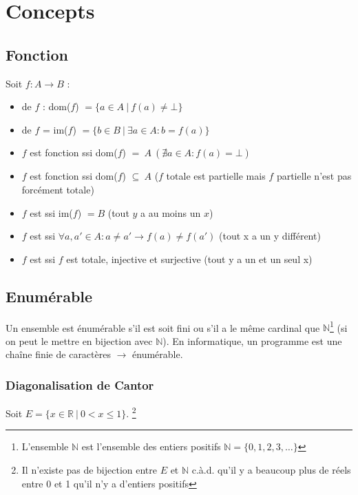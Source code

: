 \chapter{Concepts}

\section{Fonction}

Soit $f : A \rightarrow B$ :
\begin{itemize}
\item {} de $f$ : dom($f$) $= \{a \in A \ | \ f(a) \neq \bot\}$
\item {} de $f$ = im($f$) $= \{b \in B \ | \ \exists a \in A : b = f(a)\}$
\item $f$ est fonction  ssi dom($f$) $= \ A \ (\nexists a \in A : f(a) = \bot)$ 
\item $f$ est fonction  ssi dom($f$) $\subseteq \ A$ ($f$ totale est partielle mais $f$ partielle n'est pas forcément totale)
\item $f$ est  ssi im($f$) $= B$ (tout $y$ a au moins un $x$)
\item $f$ est  ssi $\forall a, a' \in A : a \neq a' \rightarrow f(a) \neq f(a')$ (tout x a un y différent)
\item $f$ est  ssi $f$ est totale, injective et surjective (tout y a un et un seul x)
\end{itemize}
\section{Enumérable}

Un ensemble est énumérable s'il est soit fini ou s'il a le même cardinal que $\mathbb{N}$\footnote{L'ensemble $\mathbb{N}$ est l'ensemble des entiers positifs $\mathbb{N} = \{0, 1, 2, 3, \ldots\}$} (si on peut le mettre en bijection avec $\mathbb{N}$). En informatique, un programme est une chaîne finie de caractères $\rightarrow$ énumérable.

\subsection{Diagonalisation de Cantor}

Soit $E = \{x \in \mathbb{R} \ | \ 0 < x \leq 1\}$. \footnote{Il n'existe pas de bijection entre $E$ et $\mathbb{N}$ c.à.d. qu'il y a beaucoup plus de réels entre 0 et 1 qu'il n'y a d'entiers positifs}

